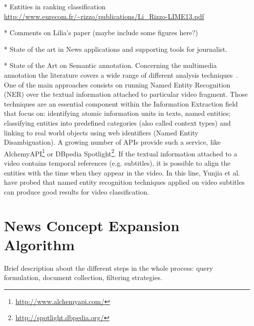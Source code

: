 \documentclass{llncs}
\begin{document}
* Entities in ranking classification
\url{http://www.eurecom.fr/~rizzo/publications/Li_Rizzo-LIME13.pdf}

* Comments on Lilia's paper (maybe include some figures here?)

* State of the art in News applications and supporting tools for journalist.

* State of the Art on Semantic annotation.
Concerning the multimedia annotation the literature covers a wide range of different analysis techniques~\cite{ballan2011event}. One of the main approaches consists on running Named Entity Recognition (NER) over the textual information attached to particular video fragment. Those techniques are an essential component within the Information Extraction field that focus on: identifying atomic information units in texts, named entities; classifying entities into predefined categories (also called context types) and linking to real world objects using web identifiers (Named Entity Disambiguation). A growing number of APIs provide such a service, like AlchemyAPI\footnote{\fontsize{8pt}{1em}\selectfont \url{http://www.alchemyapi.com/}} or DBpedia Spotlight\footnote{\fontsize{8pt}{1em}\selectfont \url{http://spotlight.dbpedia.org/}}. If the textual information attached to a video contains temporal references (e.g. subtitles), it is possible to align the entities with the time when they appear in the video. In this line, Yunjia et al.~\cite{yunjia2013} have probed that named entity recognition techniques applied on video subtitles can produce good results for video classification.


\section{News Concept Expansion Algorithm}
\label{sec:ConceptExpansion}
Brief description about the different steps in the whole process: query formulation, document collection, filtering strategies.
\end{document}
